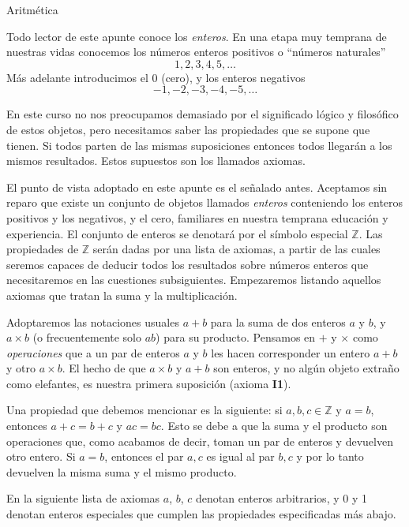 \documentclass[11pt,spanish,makeidx]{amsbook}
\theoremstyle{definition}
\theoremstyle{remark}
\begin{document}
\begin{section}{Aritmética}\label{1.1}

Todo lector de este apunte conoce los {\it enteros}. En una etapa muy temprana de nuestras vidas conocemos los números enteros positivos o ``números naturales'' 
$$1,2,3,4,5,\ldots$$
Más adelante introducimos el 0 (cero), y los enteros negativos 
$$
-1,-2,-3,-4,-5,\ldots 
$$ 

En este curso no nos preocupamos demasiado por el significado lógico y filosófico de estos objetos, pero necesitamos saber las propiedades que se supone que tienen. Si todos parten de las mismas suposiciones entonces todos llegarán a los mismos resultados. Estos supuestos son los llamados axiomas.

El punto de vista adoptado en este apunte es el señalado antes. Aceptamos sin reparo que existe un conjunto de objetos llamados { \it enteros} conteniendo los enteros positivos y los negativos, y el cero, familiares en nuestra temprana educación y experiencia. El conjunto de enteros se denotará por el símbolo especial ${\mathbb Z}$. Las propiedades de ${\mathbb Z}$ serán dadas por una lista de axiomas, a partir de las cuales seremos capaces de deducir todos los resultados sobre números enteros que necesitaremos en las cuestiones subsiguientes. Empezaremos listando aquellos axiomas que tratan la suma y la multiplicación.

Adoptaremos las notaciones usuales $a+b$ para la suma de dos enteros $a$ y $b$, y $a \times b$ (o frecuentemente solo $ab$) para su producto. Pensamos en $+$ y $\times$ como {\it operaciones} que a un par de enteros $a$ y $b$ les hacen corresponder un entero $a+b$ y otro $a\times b$. El hecho de que $a \times b$ y $a+b$ son enteros, y no algún objeto extra\~no como elefantes, es nuestra primera suposición (axioma {\bf I1}). 

Una propiedad que debemos mencionar es la siguiente: si $a,b, c \in \mathbb Z$  y $a=b$, entonces $a+c = b+c$ y $ac = bc$. Esto se debe a que la suma y el producto son operaciones que, como acabamos de decir, toman un par de enteros y  devuelven otro entero. Si $a=b$, entonces el  par $a,c$ es igual al par $b,c$ y por lo tanto devuelven la misma suma y el mismo producto.

En la siguiente lista de axiomas $a$, $b$, $c$ denotan enteros arbitrarios, y 0 y 1 denotan enteros especiales que cumplen las propiedades especificadas más abajo.


\end{section}
\end{document}
